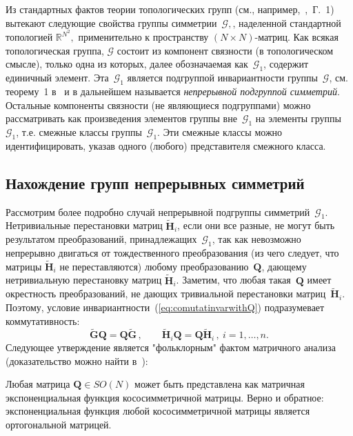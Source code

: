 {Из стандартных фактов теории топологических групп (см., например,~\cite{Zhelobenko},~Г.~1) вытекают следующие свойства группы симметрии~$\mathcal{G},$, наделенной стандартной топологией ${\mathbb R} ^{N^2},$ применительно к пространству $(N\times N)$-матриц. Как всякая топологическая группа, $\mathcal{G}$ состоит из компонент связности (в топологическом смысле), только одна из которых, далее обозначаемая как~$\mathcal{G}_1$, содержит единичный элемент. Эта~$\mathcal{G}_1$ является подгруппой инвариантности группы~$\mathcal{G}$, см. теорему~1 в~\cite{Zhelobenko} и в дальнейшем называется {\em непрерывной подгруппой симметрий}. Остальные компоненты связности (не являющиеся подгруппами) можно рассматривать как произведения элементов группы вне~$\mathcal G_1$ на элементы группы~$\mathcal G_1$, т.е. смежные классы группы~$\mathcal G_1$. Эти смежные классы можно идентифицировать, указав одного (любого) представителя смежного класса.

\subsection{Нахождение групп непрерывных симметрий}

Рассмотрим более подробно случай непрерывной подгруппы симметрий~$\mathcal{G}_1$. Нетривиальные перестановки матриц $\tilde{\textbf{H}}_i$, если они все разные, не могут быть результатом преобразований, принадлежащих~$\mathcal{G}_1$, так как невозможно непрерывно двигаться от тождественного преобразования (из чего следует, что матрицы $\tilde{\textbf{H}}_i$ не переставляются) любому преобразованию~$\textbf{Q}$, дающему нетривиальную перестановку матриц $\tilde{\textbf{H}}_i$. Заметим, что любая такая~$\textbf{Q}$ имеет окрестность преобразований, не дающих тривиальной перестановки матриц~$\tilde{\textbf{H}}_i$. Поэтому, условие инвариантности~(\ref{eq:comutatinvarwithQ}) подразумевает коммутативность:
%
\begin{equation}
\label{eq:commutat}
\tilde{\textbf{G}} \textbf{Q} = \textbf{Q} \tilde{\textbf{G}}\, , \qquad \tilde{\textbf{H}}_i \textbf{Q} = \textbf{Q} \tilde{\textbf{H}}_i\, , \ i=1,\dots,n.
\end{equation}
%
Следующее утверждение является "фольклорным" фактом матричного анализа (доказательство можно найти в~\cite{yurkov:symmetry}):

\begin{proposition} \label{prop:skew_exp}
Любая матрица $\textbf{Q} \in SO(N) $ может быть представлена как матричная экспоненциальная функция кососимметричной матрицы. Верно и обратное: экспоненциальная функция любой кососимметричной матрицы является ортогональной матрицей.
\end{proposition}

}
